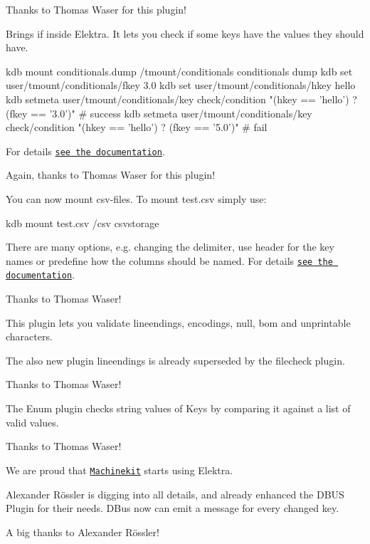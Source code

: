 Thanks to Thomas Waser for this plugin!

Brings {\ttfamily if} inside Elektra. It lets you check if some keys have the values they should have.


\begin{DoxyCode}
kdb mount conditionals.dump /tmount/conditionals conditionals dump
kdb set user/tmount/conditionals/fkey 3.0
kdb set user/tmount/conditionals/hkey hello
kdb setmeta user/tmount/conditionals/key check/condition "(hkey == 'hello') ? (fkey == '3.0')" # success
kdb setmeta user/tmount/conditionals/key check/condition "(hkey == 'hello') ? (fkey == '5.0')" # fail
\end{DoxyCode}


For details \href{https://master.libelektra.org/src/plugins/conditionals/}{\tt see the documentation}.

Again, thanks to Thomas Waser for this plugin!

You can now mount csv-\/files. To mount {\ttfamily test.\+csv} simply use\+:


\begin{DoxyCode}
kdb mount test.csv /csv csvstorage
\end{DoxyCode}


There are many options, e.\+g. changing the delimiter, use header for the key names or predefine how the columns should be named. For details \href{https://master.libelektra.org/src/plugins/csvstorage/}{\tt see the documentation}.

Thanks to Thomas Waser!

This plugin lets you validate lineendings, encodings, null, bom and unprintable characters.

The also new plugin lineendings is already superseded by the filecheck plugin.

Thanks to Thomas Waser!

The Enum plugin checks string values of Keys by comparing it against a list of valid values.

Thanks to Thomas Waser!

We are proud that \href{http://www.machinekit.io/}{\tt Machinekit} starts using Elektra.

Alexander Rössler is digging into all details, and already enhanced the D\+B\+US Plugin for their needs. D\+Bus now can emit a message for every changed key.

A big thanks to Alexander Rössler!


